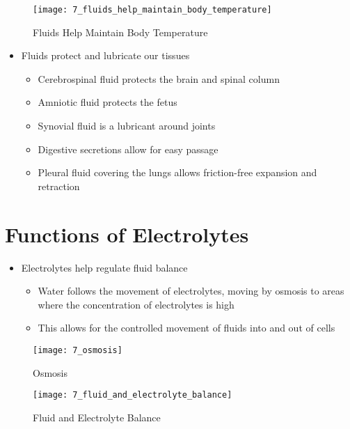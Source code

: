 \documentclass[title={Chapter 7}]{fdsn201notes}
\begin{document}
\begin{figure}[H]
	\centering
	\texttt{[image: 7\_fluids\_help\_maintain\_body\_temperature]}
	\caption{Fluids Help Maintain Body Temperature}
	\label{fig:7_fluids_help_maintain_body_temperature}
\end{figure}

\begin{itemize}
	\item Fluids protect and lubricate our tissues
	\begin{itemize}
		\item Cerebrospinal fluid protects the brain and spinal column
		\item Amniotic fluid protects the fetus
		\item Synovial fluid is a lubricant around joints
		\item Digestive secretions allow for easy passage
		\item Pleural fluid covering the lungs allows friction-free expansion and retraction
	\end{itemize}
\end{itemize}

\section{Functions of Electrolytes}\label{sec:functions-of-electrolytes}
\begin{itemize}
	\item Electrolytes help regulate fluid balance
	\begin{itemize}
		\item Water follows the movement of electrolytes, moving by osmosis to areas where the concentration of electrolytes is high
		\item This allows for the controlled movement of fluids into and out of cells
	\end{itemize}
\end{itemize}

\begin{figure}[H]
	\centering
	\texttt{[image: 7\_osmosis]}
	\caption{Osmosis}
	\label{fig:7_osmosis}
\end{figure}

\begin{figure}[H]
	\centering
	\texttt{[image: 7\_fluid\_and\_electrolyte\_balance]}
	\caption{Fluid and Electrolyte Balance}
	\label{fig:fluid_and_electrolyte_balance}
\end{figure}
\end{document}
